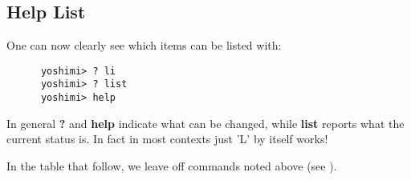 \subsection{Help List}
\label{subsec:command_line_help_list}

   One can now clearly see which items can be listed with:

   \begin{verbatim}
      yoshimi> ? li
      yoshimi> ? list
      yoshimi> help
   \end{verbatim}

   In general \textbf{?} and \textbf{help} indicate what can be changed, while
   \textbf{list} reports what the current status is. In fact in most contexts just 'L' by itself works!

   In the table that follow, we leave off commands noted above
   (see ).


